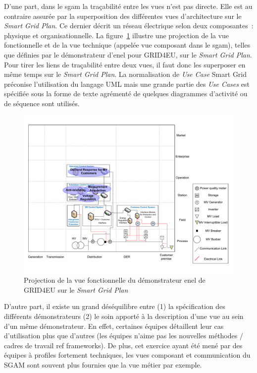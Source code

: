 D'une part, dans le \gls{sgam} la traçabilité entre les vues n'est pas directe.
Elle est au contraire assurée par la superposition des différentes vues
d'architecture sur le \textit{Smart Grid Plan}. Ce dernier décrit un réseau
électrique selon deux composantes~: physique et organisationnelle. La
figure~\ref{fig:enel_sgplan} illustre une projection de la vue fonctionnelle et
de la vue technique (appelée vue composant dans le \gls{sgam}), telles que
définies par le démonstrateur d'\gls{enel} pour GRID4EU, sur le \textit{Smart
Grid Plan}. Pour tirer les liens de traçabilité entre deux vues, il faut donc
les superposer en même temps sur le \textit{Smart Grid Plan}. La normalisation
de \textit{Use Case} Smart Grid préconise l'utilisation du langage UML mais une
grande partie des \textit{Use Cases} est spécifiée sous la forme de texte
agrémenté de quelques diagrammes d'activité ou de séquence sont utilisés.

\begin{figure}[!ht]
 	\begin{center}
	 \includegraphics[trim=0cm 1cm 0cm 1cm, width=1\textwidth]{figures/4_demarche/enel.pdf}
	\end{center}
	\caption{Projection de la vue fonctionnelle du démonstrateur \gls{enel} de
GRID4EU sur le \textit{Smart Grid Plan}} \label{fig:enel_sgplan}
\end{figure}

D'autre part, il existe un grand déséquilibre entre (1) la spécification des
différents démonstrateurs (2) le soin apporté à la description d'une vue au sein
d'un même démonstrateur. En effet, certaines équipes détaillent leur cas
d'utilisation plus que d'autres (les équipes n'aime pas les nouvelles méthodes /
cadres de travail ref frameworks). De plus, cet exercice ayant été mené par des
équipes à profiles fortement techniques, les vues composant et communication du
SGAM sont souvent plus fournies que la vue métier par exemple.

